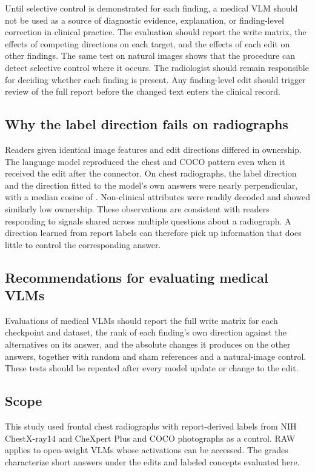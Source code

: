Until selective control is demonstrated for each finding, a medical VLM should not be used as a source of diagnostic evidence, explanation, or finding-level correction in clinical practice. The evaluation should report the write matrix, the effects of competing directions on each target, and the effects of each edit on other findings. The same test on natural images shows that the procedure can detect selective control where it occurs. The radiologist should remain responsible for deciding whether each finding is present. Any finding-level edit should trigger review of the full report before the changed text enters the clinical record.

\subsection{Why the label direction fails on radiographs}

Readers given identical image features and edit directions differed in ownership. The language model reproduced the chest and COCO pattern even when it received the edit after the connector. On chest radiographs, the label direction and the direction fitted to the model's own answers were nearly perpendicular, with a median cosine of \cfAnsCosChestMed{}. Non-clinical attributes were readily decoded and showed similarly low ownership. These observations are consistent with readers responding to signals shared across multiple questions about a radiograph. A direction learned from report labels can therefore pick up information that does little to control the corresponding answer.

\subsection{Recommendations for evaluating medical VLMs}

Evaluations of medical VLMs should report the full write matrix for each checkpoint and dataset, the rank of each finding's own direction against the alternatives on its answer, and the absolute changes it produces on the other answers, together with random and sham references and a natural-image control. These tests should be repeated after every model update or change to the edit.

\subsection{Scope}
\label{sec:limitations}

This study used frontal chest radiographs with report-derived labels from NIH ChestX-ray14 and CheXpert Plus and COCO photographs as a control. RAW applies to open-weight VLMs whose activations can be accessed. The grades characterize short answers under the edits and labeled concepts evaluated here.

